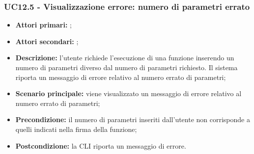 \subsubsection{UC12.5 - Visualizzazione errore: numero di parametri errato}
\begin{itemize}
	\item \textbf{Attori primari:} \ua{};
	\item \textbf{Attori secondari:} \re{};
	\item \textbf{Descrizione:} l’utente richiede l’esecuzione di una funzione inserendo un numero di parametri diverso dal numero di parametri richiesto. Il sistema riporta un messaggio di errore relativo al numero errato di parametri;
	\item \textbf{Scenario principale:} viene visualizzato un messaggio di errore relativo al numero errato di parametri;
	\item \textbf{Precondizione:} il numero di parametri inseriti dall’utente non corrisponde a quelli indicati nella firma della funzione;
	\item \textbf{Postcondizione:} la CLI riporta un messaggio di errore.
\end{itemize}